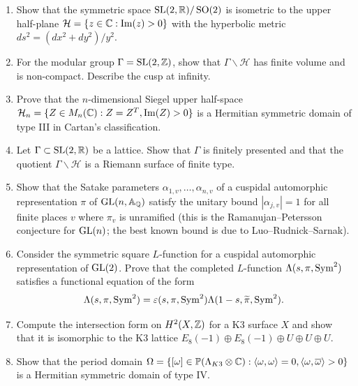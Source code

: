 \begin{enumerate}
    \item [B] Show that the symmetric space \(\operatorname{SL}(2,\mathbb{R})/\operatorname{SO}(2)\) is isometric to the upper half-plane \(\mathcal{H} = \{z \in \mathbb{C} : \operatorname{Im}(z) > 0\}\) with the hyperbolic metric \(ds^2 = (dx^2 + dy^2)/y^2\).

    \item [B] For the modular group \(\Gamma = \operatorname{SL}(2,\mathbb{Z})\), show that \(\Gamma \backslash \mathcal{H}\) has finite volume and is non-compact. Describe the cusp at infinity.

    \item [I] Prove that the \(n\)-dimensional Siegel upper half-space \(\mathcal{H}_n = \{Z \in M_n(\mathbb{C}): Z = Z^T, \operatorname{Im}(Z) > 0\}\) is a Hermitian symmetric domain of type III in Cartan's classification.

    \item [I] Let \(\Gamma \subset \operatorname{SL}(2,\mathbb{R})\) be a lattice. Show that \(\Gamma\) is finitely presented and that the quotient \(\Gamma \backslash \mathcal{H}\) is a Riemann surface of finite type.

    \item [A] Show that the Satake parameters \(\alpha_{1,v}, \dots, \alpha_{n,v}\) of a cuspidal automorphic representation \(\pi\) of \(\operatorname{GL}(n,\mathbb{A}_{\mathbb{Q}})\) satisfy the unitary bound \(|\alpha_{j,v}| = 1\) for all finite places \(v\) where \(\pi_v\) is unramified (this is the Ramanujan--Petersson conjecture for \(\operatorname{GL}(n)\); the best known bound is due to Luo--Rudnick--Sarnak).

    \item [I] Consider the symmetric square \(L\)-function for a cuspidal automorphic representation of \(\operatorname{GL}(2)\). Prove that the completed \(L\)-function \(\Lambda(s, \pi, \operatorname{Sym}^2)\) satisfies a functional equation of the form
    \[
    \Lambda(s, \pi, \operatorname{Sym}^2) = \varepsilon(s, \pi, \operatorname{Sym}^2) \Lambda(1-s, \widetilde{\pi}, \operatorname{Sym}^2).
    \]

    \item [I] Compute the intersection form on \(H^2(X,\mathbb{Z})\) for a K3 surface \(X\) and show that it is isomorphic to the K3 lattice \(E_8(-1) \oplus E_8(-1) \oplus U \oplus U \oplus U\).

    \item [I] Show that the period domain \(\Omega = \{ [\omega] \in \mathbb{P}(\Lambda_{K3} \otimes \mathbb{C}): \langle \omega, \omega \rangle = 0, \langle \omega, \overline{\omega} \rangle > 0 \}\) is a Hermitian symmetric domain of type IV.


\end{enumerate}
